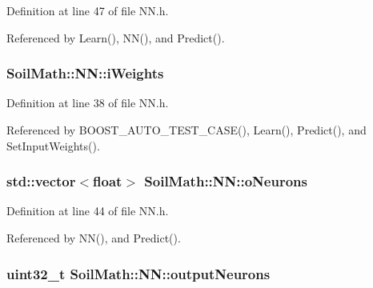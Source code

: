 Definition at line 47 of file N\+N.\+h.



Referenced by Learn(), N\+N(), and Predict().

\hypertarget{class_soil_math_1_1_n_n_a96b0fe3caeed3d285204a6b4506075c9}{}
\subsubsection[{i\+Weights}]{ Soil\+Math\+::\+N\+N\+::i\+Weights}\label{class_soil_math_1_1_n_n_a96b0fe3caeed3d285204a6b4506075c9}


Definition at line 38 of file N\+N.\+h.



Referenced by B\+O\+O\+S\+T\+\_\+\+A\+U\+T\+O\+\_\+\+T\+E\+S\+T\+\_\+\+C\+A\+S\+E(), Learn(), Predict(), and Set\+Input\+Weights().

\hypertarget{class_soil_math_1_1_n_n_a50a52b41982f6845dc5294f17607774b}{}
\subsubsection[{o\+Neurons}]{\setlength{\rightskip}{0pt plus 5cm}std\+::vector$<$float$>$ Soil\+Math\+::\+N\+N\+::o\+Neurons\hspace{0.3cm}{\ttfamily [private]}}\label{class_soil_math_1_1_n_n_a50a52b41982f6845dc5294f17607774b}


Definition at line 44 of file N\+N.\+h.



Referenced by N\+N(), and Predict().

\hypertarget{class_soil_math_1_1_n_n_a65ce6c65168fbe7051c25dccf4bf2b0c}{}
\subsubsection[{output\+Neurons}]{\setlength{\rightskip}{0pt plus 5cm}uint32\+\_\+t Soil\+Math\+::\+N\+N\+::output\+Neurons\hspace{0.3cm}{\ttfamily [private]}}\label{class_soil_math_1_1_n_n_a65ce6c65168fbe7051c25dccf4bf2b0c}


